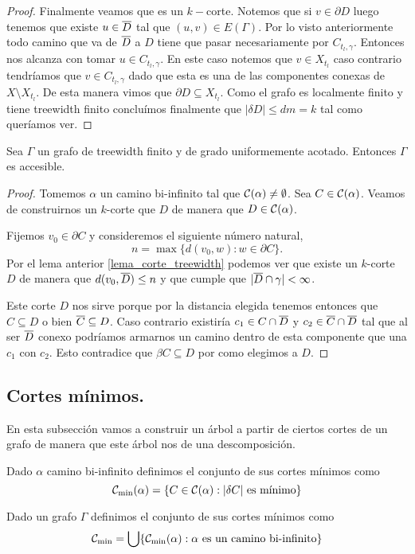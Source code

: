 \documentclass[tesis.tex]{subfiles}
\begin{document}
\begin{proof}
	Finalmente veamos que es un $k-$corte.
	Notemos que si $v \in \partial D$ luego tenemos que existe $u \in \overline D$ tal que $(u,v) \in E(\Gamma)$.
	Por lo visto anteriormente todo camino que va de $\overline D$ a $D$ tiene que pasar necesariamente por $C_{t_l, \gamma}$. 
	Entonces nos alcanza con tomar $u \in C_{t_l, \gamma}$.
	En este caso notemos que $v \in X_{t_l}$ caso contrario tendríamos que $v \in C_{t_l, \gamma}$ dado que esta es una de las componentes conexas de $X \setminus X_{t_l}$.
	De esta manera vimos que $\partial D \subseteq X_{t_l}$.
	Como el grafo es localmente finito y tiene treewidth finito concluímos finalmente que $|\delta D| \le dm = k$ tal como queríamos ver.
		
\end{proof}


\begin{teo}
	Sea $\Gamma$ un grafo de treewidth finito y de grado uniformemente acotado.
	Entonces $\Gamma$ es accesible.
\end{teo}
\begin{proof}
	Tomemos $\alpha$ un camino bi-infinito tal que ${\cal C}(\alpha) \neq \emptyset$.
	Sea $C \in {\cal C}(\alpha)$.
	Veamos de construirnos un $k$-corte que $D$ de manera que $D \in {\cal C}(\alpha)$.
	
	Fijemos $v_0  \in \partial C$ y consideremos el siguiente número natural,
	\[
		n = \max \{ d(v_0,w) : w \in \partial C  \}.
	\]
	Por el lema anterior \ref{lema_corte_treewidth} podemos ver que existe un $k$-corte $D$ de manera que $d(v_0, \overline D) \le n$ y que cumple que $|\overline D \cap \gamma| < \infty$.
	
	Este corte $D$ nos sirve porque por la distancia elegida tenemos entonces que $C \subseteq D$ o bien $\overline C \subseteq D$.
	Caso contrario existiría $c_1 \in C \cap \overline D$ y $c_2 \in \overline C \cap \overline D$ tal que al ser $\overline D$ conexo podríamos armarnos un camino dentro de esta componente que una $c_1$ con $c_2$.
	Esto contradice que $\beta C \subseteq D$ por como elegimos a $D$.	
\end{proof}


\subsection{Cortes mínimos.}
En esta subsección vamos a construir un árbol a partir de ciertos cortes de un grafo de manera que este árbol nos de una descomposición.

\begin{deff}
	Dado $\alpha$ camino bi-infinito definimos el conjunto de sus cortes mínimos como
	\[
		\cam = \{  C \in \ca : |\delta C| \ \text{es mínimo}  \}
	\]
	
	Dado un grafo $\Gamma$ definimos el conjunto de sus cortes mínimos como 
	\[
		{\cal C}_{\text{min}} = \bigcup \{ {\cal C}_{\text{min}}(\alpha) : \alpha \ \text{es un camino bi-infinito}  \}
	\]
\end{deff}
\end{document}

